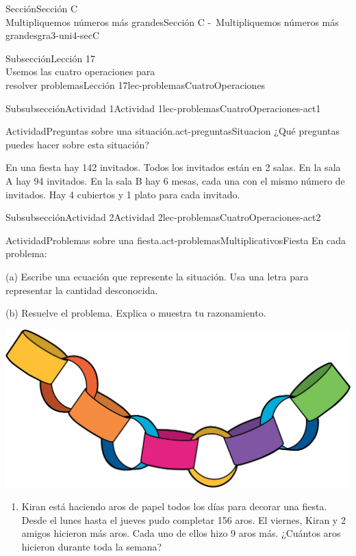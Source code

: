 \begin{sectionptx}{Sección}{{\Large Sección C\\}Multipliquemos números más grandes}{}{Sección C -~Multipliquemos números más grandes}{}{}{gra3-uni4-secC}
\begin{subsectionptx}{Subsección}{{\normalsize Lección 17\\[-0.05cm]}Usemos las cuatro operaciones para\\resolver problemas}{}{Lección 17}{}{}{lec-problemasCuatroOperaciones}
\begin{subsubsectionptx}{Subsubsección}{Actividad 1}{}{Actividad 1}{}{}{lec-problemasCuatroOperaciones-act1}
\begin{activity}{Actividad}{Preguntas sobre una situación.}{act-preguntasSituacion}
¿Qué preguntas puedes hacer sobre esta situación?%
\par
En una fiesta hay 142 invitados. Todos los invitados están en 2 salas. En la sala A hay 94 invitados. En la sala B hay 6 mesas, cada una con el mismo número de invitados. Hay 4 cubiertos y 1 plato para cada invitado.%
\end{activity}%
\end{subsubsectionptx}
%
%
\typeout{************************************************}
\typeout{************************************************}
%
\clearpage
\begin{subsubsectionptx}{Subsubsección}{Actividad 2}{}{Actividad 2}{}{}{lec-problemasCuatroOperaciones-act2}
\begin{activity}{Actividad}{Problemas sobre una fiesta.}{act-problemasMultiplicativosFiesta}%
En cada problema:%
\begin{sidebyside}{2}{0.02}{0}{0.08}%
\begin{sbspanel}{0.6}%
(a) Escribe una ecuación que represente la situación. Usa una letra para representar la cantidad desconocida.%
\par
(b) Resuelve el problema. Explica o muestra tu razonamiento.%
\end{sbspanel}%
\begin{sbspanel}{0.3}%
\includegraphics[max width=\linewidth, center]{external/png-source/CS 3.4 Lesson 17.png}
\end{sbspanel}%
\end{sidebyside}%
%
\begin{enumerate}
\item{}Kiran está haciendo aros de papel todos los días para decorar una fiesta. Desde el lunes hasta el jueves pudo completar 156 aros. El viernes, Kiran y 2 amigos hicieron más aros. Cada uno de ellos hizo 9 aros más. ¿Cuántos aros hicieron durante toda la semana?%

\end{enumerate}
\end{activity}
\end{subsubsectionptx}
\end{subsectionptx}
\end{sectionptx}
